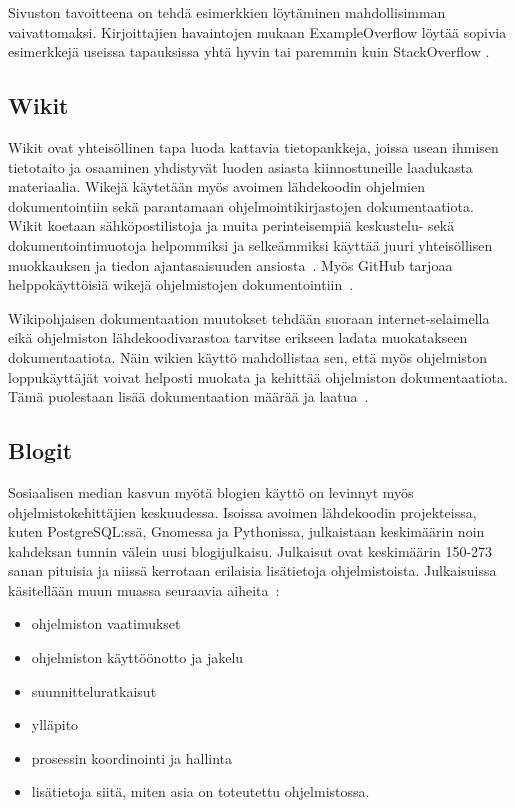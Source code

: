 \documentclass[finnish]{tktltiki2}
\theoremstyle{definition}
\theoremstyle{remark}
\begin{document}
Sivuston tavoitteena on tehdä esimerkkien löytäminen mahdollisimman vaivattomaksi. Kirjoittajien havaintojen mukaan ExampleOverflow löytää sopivia esimerkkejä useissa tapauksissa yhtä hyvin tai paremmin kuin StackOverflow \cite{example-overflow-social-media-for-code-recommendations}.

\subsection{Wikit}
\label{ch:wiki}
Wikit ovat yhteisöllinen tapa luoda kattavia tietopankkeja, joissa usean ihmisen tietotaito ja osaaminen yhdistyvät luoden asiasta kiinnostuneille laadukasta materiaalia. Wikejä käytetään myös avoimen lähdekoodin ohjelmien dokumentointiin sekä parantamaan ohjelmointikirjastojen dokumentaatiota. Wikit koetaan sähköpostilistoja ja muita perinteisempiä keskustelu- sekä dokumentointimuotoja helpommiksi ja selkeämmiksi käyttää juuri yhteisöllisen muokkauksen ja tiedon ajantasaisuuden ansiosta~\cite{using-wikis-in-sw}.
Myös GitHub tarjoaa helppokäyttöisiä wikejä ohjelmistojen dokumentointiin~\cite{github-wiki}.

Wikipohjaisen dokumentaation muutokset tehdään suoraan internet-selaimella eikä ohjelmiston lähdekoodivarastoa tarvitse erikseen ladata muokatakseen dokumentaatiota. Näin wikien käyttö mahdollistaa sen, että myös ohjelmiston loppukäyttäjät voivat helposti muokata ja kehittää ohjelmiston dokumentaatiota. Tämä puolestaan lisää dokumentaation määrää ja laatua~\cite{wiki-social-knowledge-construction}.


\subsection{Blogit}
Sosiaalisen median kasvun myötä blogien käyttö on levinnyt myös ohjelmistokehittäjien keskuudessa. Isoissa avoimen lähdekoodin projekteissa, kuten PostgreSQL:ssä, Gnomessa ja Pythonissa, julkaistaan keskimäärin noin kahdeksan tunnin välein uusi blogijulkaisu. Julkaisut ovat keskimäärin 150-273 sanan pituisia ja niissä kerrotaan erilaisia lisätietoja ohjelmistoista. Julkaisuissa käsitellään muun muassa seuraavia aiheita~\cite{how-dev-blog}:
\begin{itemize}
  \item ohjelmiston vaatimukset
  \item ohjelmiston käyttöönotto ja jakelu
  \item suunnitteluratkaisut
  \item ylläpito
  \item prosessin koordinointi ja hallinta
\item lisätietoja siitä, miten asia on toteutettu ohjelmistossa.
\end{itemize}
\end{document}
